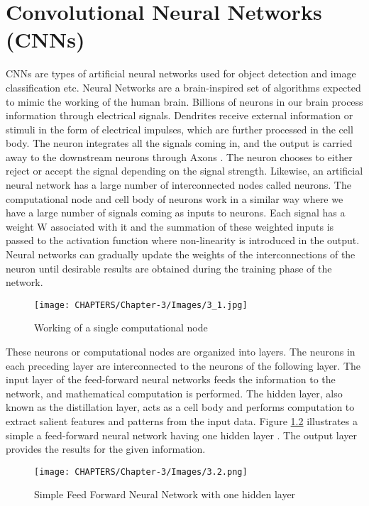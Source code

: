 \chapter{Convolutional Neural Networks (CNNs)}
\label{Chapter 3}

CNNs are types of artificial neural networks used for object detection and image classification etc. Neural Networks are a brain-inspired set of algorithms expected to mimic the working of the human brain. Billions of neurons in our brain process information through electrical signals. Dendrites receive external information or stimuli in the form of electrical impulses, which are further processed in the cell body. The neuron integrates all the signals coming in, and the output is carried away to the downstream neurons through Axons \cite{chap_3_article:1}. The neuron chooses to either reject or accept the signal depending on the signal strength. Likewise, an artificial neural network has a large number of interconnected nodes called neurons. The computational node and cell body of neurons work in a similar way where we have a large number of signals coming as inputs to neurons. Each signal has a weight W associated with it and the 
summation of these weighted inputs is passed to the activation function where 
 non-linearity is introduced in the output. Neural networks can gradually 
update the weights of the interconnections of the neuron until desirable results 
are obtained during the training phase of the network.

\begin{figure}[H]
    \centering
        \texttt{[image: CHAPTERS/Chapter-3/Images/3\_1.jpg]}
    \caption{Working of a single computational node}
    \label{fig:3.1}
\end{figure}

These neurons or computational nodes are organized into layers. The neurons in each preceding layer are interconnected to the neurons of the following layer. The input layer of the feed-forward neural networks feeds the information to the network, and mathematical computation is performed. The hidden layer, also known as the distillation layer, acts as a cell body and performs computation to extract salient features and patterns from the input data. Figure \ref{fig:3.2} illustrates a simple 
a feed-forward neural network having one 
hidden layer \cite{chap_3_article:2}.
The output layer provides the results for the given information. 

\begin{figure}[H]
    \centering
        \texttt{[image: CHAPTERS/Chapter-3/Images/3.2.png]}
    \caption{Simple Feed Forward Neural Network with one hidden layer}
    \label{fig:3.2}
\end{figure}

